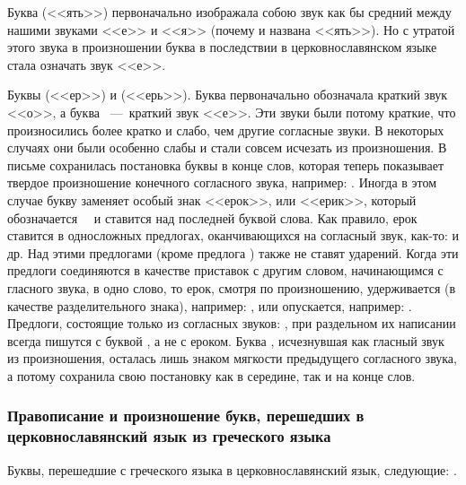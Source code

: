 \documentclass[11pt,a4paper,oneside]{memoir}
\begin{document}
        Буква {} (<<ять>>) первоначально изображала собою звук
        как бы средний между нашими звуками <<е>> и <<я>> (почему и
        названа <<ять>>). Но с утратой этого звука в произношении
        буква {} в последствии в церковнославянском языке
        стала означать звук <<е>>.

        Буквы {} (<<ер>>) и {} (<<ерь>>). Буква
        {} первоначально обозначала краткий звук <<о>>, а
        буква {}~---~краткий звук <<е>>. Эти звуки были потому
        краткие, что произносились более кратко и слабо, чем другие
        согласные звуки. В некоторых случаях они были особенно слабы
        и стали совсем исчезать из произношения. В письме сохранилась
        постановка буквы {} в конце слов, которая теперь
        показывает твердое произношение конечного согласного звука,
        например: {}. Иногда в этом случае
        букву {} заменяет особый знак <<ерок>>, или <<ерик>>,
        который обозначается~~{} и ставится над последней
        буквой слова. Как правило, ерок ставится в односложных
        предлогах, оканчивающихся на согласный звук, как-то:
        {} и др. Над этими
        предлогами (кроме предлога {}) также не ставят
        ударений. Когда эти предлоги соединяются в качестве приставок
        с другим словом, начинающимся с гласного звука, в одно слово,
        то ерок, смотря по произношению, удерживается (в качестве
        разделительного знака), например: {}, или опускается, например: {}.
        Предлоги, состоящие только из согласных звуков: {}, при раздельном их написании всегда пишутся с буквой
        {}, а не с ероком. Буква {}, исчезнувшая как
        гласный звук из произношения, осталась лишь знаком мягкости
        предыдущего согласного звука, а потому сохранила свою
        постановку как в середине, так и на конце слов.

        \subsubsection{Правописание и произношение букв, перешедших в
        церковнославянский язык из греческого языка}

        Буквы, перешедшие с греческого языка в церковнославянский
        язык, следующие: {}.
\end{document}
